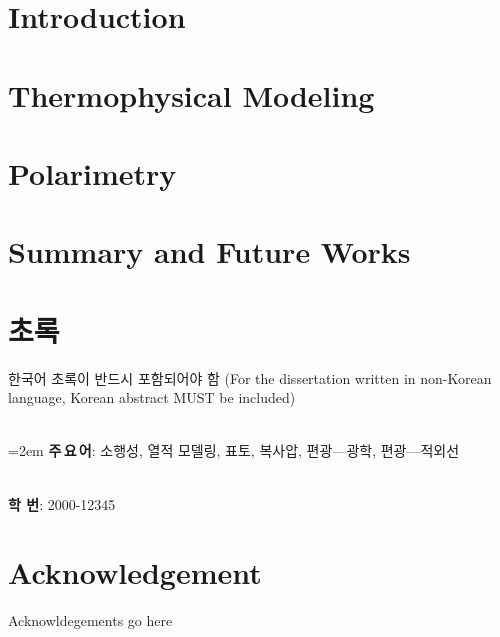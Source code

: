 \documentclass[12pt]{report}
\begin{document}
{
\tableofcontents
\listoffigures{}
\listoftables{}
}

\chapter{Introduction}\label{c:intro}


\chapter{Thermophysical Modeling}\label{c:tpm}



\chapter{Polarimetry}\label{c:pol}


\chapter{Summary and Future Works}


\clearpage




\chapter*{초록}\setcounter{page}{3}
한국어 초록이 반드시 포함되어야 함 (For the dissertation written in non-Korean language, Korean abstract MUST be included)


~\\
\hangindent=2em
\textbf{주\,요\,어}: 소행성, 열적 모델링, 표토, 복사압, 편광---광학, 편광---적외선

~\\
\noindent \textbf{학 \quad 번}: 2000-12345


\chapter*{Acknowledgement}
Acknowldegements go here
\end{document}
